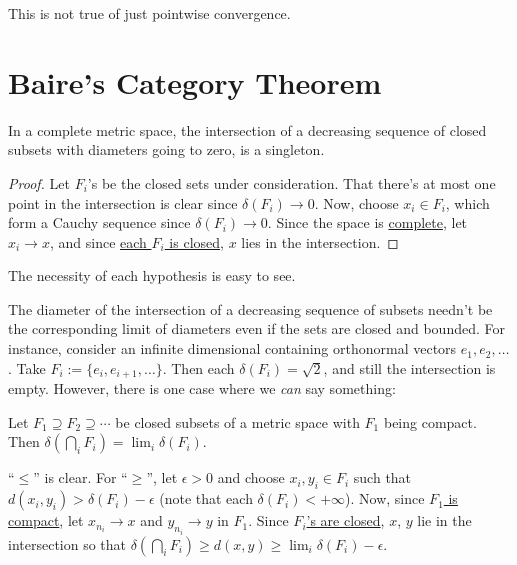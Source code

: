 	This is \ofc not true of just pointwise convergence.
	
	
	
	
	


\section{Baire's Category Theorem}

	\begin{prp}
		In a complete metric space, the intersection of a decreasing sequence of closed subsets with diameters going to zero, is a singleton.
	\end{prp}
	
	\begin{proof}
		Let $F_i$'s be the closed sets under consideration. That there's at most one point in the intersection is clear since \uline{$\delta(F_i)\to 0$}. Now, choose
		$x_i\in F_i$, which form a Cauchy sequence since \uline{$\delta(F_i)\to 0$}. Since the space is \uline{complete}, let $x_i\to x$, and since \uline{each $F_i$ is closed}, $x$ lies in the intersection.
	\end{proof}
	
	\begin{rmk}
		The necessity of each hypothesis is easy to see.
	\end{rmk}
	
	\begin{dgrs}
		The diameter of the intersection of a decreasing sequence of subsets needn't be the corresponding limit of diameters even if the sets are closed and bounded. For instance, consider an infinite dimensional \NLS containing orthonormal vectors $e_1, e_2, \ldots$. Take $F_i := \{e_i, e_{i + 1}, \ldots\}$. Then each $\delta(F_i) = \sqrt 2$, and still the intersection is empty. However, there is one case where we \emph{can} say something:
		
		\begin{prp}
			Let $F_1\supseteq F_2\supseteq\cdots$ be closed subsets of a metric space with $F_1$ being compact. Then $\delta(\bigcap_i F_i) = \lim_i\delta(F_i)$.
		\end{prp}
		
		\begin{dgrsProof}
			``$\le$'' is clear. For ``$\ge$'', let $\epsilon> 0$ and choose $x_i, y_i\in F_i$ such that $d(x_i, y_i) > \delta(F_i) - \epsilon$ (note that each $\delta(F_i) < +\infty$). Now, since \uline{$F_1$ is compact}, let $x_{n_i}\to x$ and $y_{n_i}\to y$ in $F_1$. Since \uline{$F_i$'s are closed}, $x$, $y$ lie in the intersection so that $\delta(\bigcap_i F_i)\ge d(x, y)\ge \lim_i\delta(F_i) - \epsilon$.
		\end{dgrsProof}
	\end{dgrs}
	
